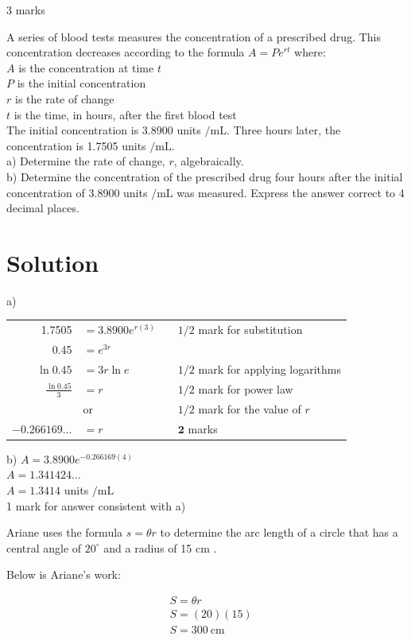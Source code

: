 \documentclass[10pt]{article}
\begin{document}
3 marks

A series of blood tests measures the concentration of a prescribed drug. This concentration decreases according to the formula $A=P e^{r t}$ where:\\
$A$ is the concentration at time $t$\\
$P$ is the initial concentration\\
$r$ is the rate of change\\
$t$ is the time, in hours, after the first blood test\\
The initial concentration is 3.8900 units $/ \mathrm{mL}$. Three hours later, the concentration is 1.7505 units $/ \mathrm{mL}$.\\
a) Determine the rate of change, $r$, algebraically.\\
b) Determine the concentration of the prescribed drug four hours after the initial concentration of 3.8900 units $/ \mathrm{mL}$ was measured. Express the answer correct to 4 decimal places.

\section*{Solution}
a) \begin{tabular}{rlrl}
1.7505 & $=3.8900 e^{r(3)}$ &  & $1 / 2$ mark for substitution \\
0.45 & $=e^{3 r}$ &  &  \\
$\ln 0.45$ & $=3 r \ln e$ &  & $1 / 2$ mark for applying logarithms \\
$\frac{\ln 0.45}{3}$ & $=r$ &  & $1 / 2$ mark for power law \\
 & or &  & $1 / 2$ mark for the value of $r$ \\
$-0.266169 \ldots$ & $=r$ &  & $\mathbf{2}$ marks \\
\end{tabular}

b) $A=3.8900 e^{-0.266169(4)}$\\
$A=1.341424 \ldots$\\
$A=1.3414$ units $/ \mathrm{mL}$\\
1 mark for answer consistent with a)

Ariane uses the formula $s=\theta r$ to determine the arc length of a circle that has a central angle of $20^{\circ}$ and a radius of 15 cm .

Below is Ariane's work:

$$
\begin{aligned}
& S=\theta r \\
& S=(20)(15) \\
& S=300 \mathrm{~cm}
\end{aligned}
$$
\end{document}
